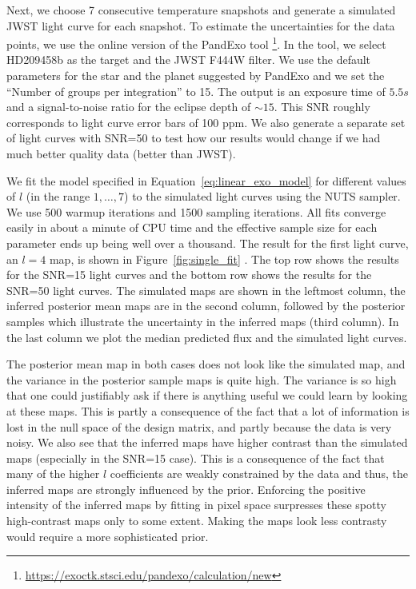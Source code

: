 \documentclass[12pt,dvipsnames]{report}
\begin{document}
Next, we choose 7 consecutive temperature snapshots and generate a simulated JWST light curve 
for each snapshot. To estimate the uncertainties for the data points, we use the
online version of the PandExo tool
\citep{2017PASP..129f4501B}\footnote{\url{https://exoctk.stsci.edu/pandexo/calculation/new}}. 
In the tool, we select HD209458b as the target and the JWST F444W filter. We use the default 
parameters for the star and the planet suggested by PandExo and we set the ``Number of 
groups per integration'' to 15. The output is an exposure time of $5.5s$ and a 
signal-to-noise ratio for the eclipse depth of $\sim 15$.  This SNR roughly corresponds to 
light curve error bars of 100 ppm.  We also generate a separate set of light curves with 
SNR=50 to test how our results would change if we had much better quality data 
(better than JWST).


We fit the model specified in Equation~\ref{eq:linear_exo_model} for different values of 
$l$ (in the range $1,\ldots,7$) to the simulated light curves using the NUTS sampler.
We use 500 warmup iterations and 1500 sampling iterations. All fits converge easily in 
about a minute of CPU time and the effective sample size for each parameter ends up being 
well over a thousand. The result for the first light curve, an $l=4$ map, is shown in 
Figure~\ref{fig:single_fit} .
The top row shows the results for the SNR=15 light curves and the bottom row shows the
results for the SNR=50 light curves. The simulated maps are shown in the leftmost 
column, the inferred posterior mean maps are in the second column, followed by 
the posterior samples which illustrate the uncertainty in the inferred maps (third column).
In the last column we plot the median predicted flux and the simulated light curves.

The posterior mean map in both cases does not look like the simulated map, and 
the variance in the posterior sample maps is quite high. 
The variance is so high that one could justifiably ask if there is anything useful we 
could learn by looking at these maps. 
This is partly a consequence 
of the fact that a lot of information is lost in the null space of the design matrix,
and partly because the data is very noisy. 
We also see that the inferred maps have higher contrast than the simulated maps 
(especially in the SNR=15 case). 
This is a consequence of the fact that many of the higher $l$
coefficients are weakly constrained by the data and thus, the inferred maps are 
strongly influenced by the prior. 
Enforcing the positive intensity of the inferred maps by fitting in pixel space 
surpresses these spotty high-contrast maps only to some extent.
Making the maps look less contrasty would require a more sophisticated prior.
\end{document}
